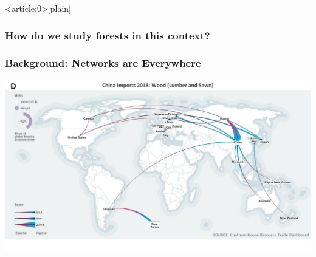\documentclass[aspectratio=169]{beamer}
\begin{document}
{ %
    \begin{frame}<article:0>[plain]
     \end{frame}
}


\begin{frame}
  \frametitle{How do we study forests in this context?}


\end{frame}


\begin{frame}
  \frametitle{Background: Networks are Everywhere}


\begin{center}\includegraphics[width=0.5\linewidth]{images/resourcetrade_network} \end{center}

\end{frame}
\end{document}
